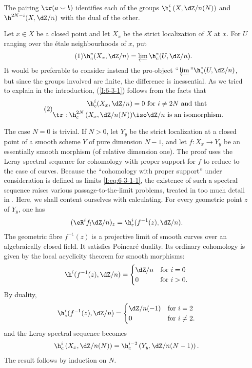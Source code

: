 \begin{theorem}\label{I:6-3-1}
The pairing $\tr(a\smallsmile b)$ identifies each of the groups
$\h_c^i\left(X,\dZ/n(N)\right)$ and $\h^{2N-i}(X,\dZ/n)$ with the dual
of the other.
\end{theorem}

Let $x\in X$ be a closed point and let $X_x$ be the strict localization
of $X$ at $x$. For $U$ ranging over the étale neighbourhoods of $x$,
put
\begin{equation*}\tag{1}\label{I:eq:6-3-1-1}
  \h_c^*(X_x,\dZ/n) = \varprojlim \h_c^*(U,\dZ/n) \text{.}
\end{equation*}
It would be preferable to consider instead the pro-object
$\text{“}\varprojlim\text{”}\h_c^*(U,\dZ/n)$, but since the
groups involved are finite, the difference is inessential. As we tried
to explain in the introduction, (\ref{I:6-3-1}) follows from the facts
that
\begin{equation*}\tag{2}\label{I:eq:6-3-1-2}
\begin{aligned}
  \h_c^i(X_x,\dZ/n) &= 0 \text{ for $i\ne 2N$ and that } \\
  \tr : \h_c^{2 N}\left(X_x,  \dZ/n(N)\right) &\iso \dZ/n \text{ is an isomorphism.}
\end{aligned}
\end{equation*}

The case $N=0$ is trivial. If $N>0$, let $Y_y$ be the strict
localization at a closed point of a smooth scheme $Y$ of pure dimension
$N-1$, and let $f:X_x\to Y_y$ be an essentially smooth morphism (of
relative dimension one). The proof uses the Leray spectral sequence for
cohomology with proper support for $f$ to reduce to the case of curves.
Because the “cohomology with proper support” under consideration is
defined as limits \eqref{I:eq:6-3-1-1}, the existence of such a spectral
sequence raises various passage-to-the-limit problems, treated in too much
detail in \cite[XVIII]{sga4}. Here, we shall content ourselves with calculating. For every geometric point $z$ of $Y_y$,
one has
\[
  (\eR^if_! \dZ/n)_z = \h_c^i(f^{-1}(z),\dZ/n) \text{.}
\]
The geometric fibre $f^{-1}(z)$ is a projective limit of smooth curves
over an algebraically closed field. It satisfies Poincaré duality. Its
ordinary cohomology is given by the local acyclicity theorem for smooth
morphisms:
\[
  \h^i(f^{-1}(z),\dZ/n)
    = \begin{cases}
        \dZ/n & \text{for $i=0$} \\
        0     & \text{for $i>0$.}
      \end{cases}
\]
By duality,
\[
  \h_c^i(f^{-1}(z),\dZ/n)
    = \begin{cases}
        \dZ/n(-1) & \text{for $i=2$} \\
        0         & \text{for $i\ne 2$.}
      \end{cases}
\]
and the Leray spectral sequence becomes
\[
  \h_c^i\left(X_x,\dZ/n(N)\right) = \h_c^{i-2}\left(Y_y,\dZ/n(N-1)\right) \text{.}
\]
The result follows by induction on $N$.

